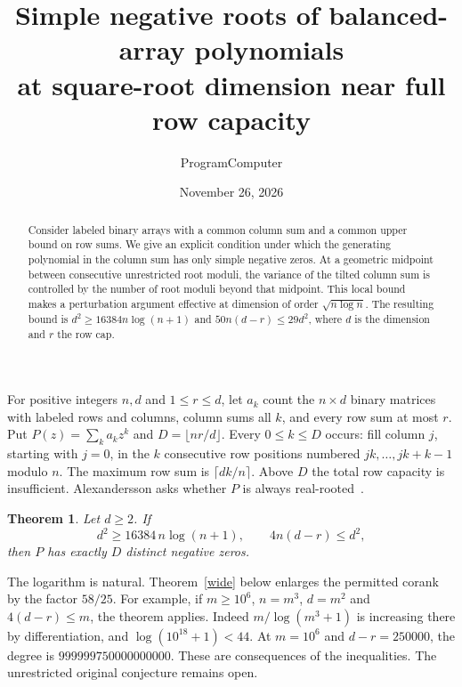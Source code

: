 \documentclass[11pt]{article}
\title{Simple negative roots of balanced-array polynomials\\at square-root dimension near full row capacity}
\author{ProgramComputer}
\date{November 26, 2026}
\newtheorem{theorem}{Theorem}
\begin{document}
\maketitle
\begin{abstract}
Consider labeled binary arrays with a common column sum and a common upper bound on row sums. We give an explicit condition under which the generating polynomial in the column sum has only simple negative zeros. At a geometric midpoint between consecutive unrestricted root moduli, the variance of the tilted column sum is controlled by the number of root moduli beyond that midpoint. This local bound makes a perturbation argument effective at dimension of order $\sqrt{n\log n}$. The resulting bound is $d^2\ge16384n\log(n+1)$ and $50n(d-r)\le29d^2$, where $d$ is the dimension and $r$ the row cap.
\end{abstract}

For positive integers $n,d$ and $1\le r\le d$, let $a_k$ count the $n\times d$ binary matrices with labeled rows and columns, column sums all $k$, and every row sum at most $r$. Put $P(z)=\sum_k a_k z^k$ and $D=\lfloor nr/d\rfloor$. Every $0\le k\le D$ occurs: fill column $j$, starting with $j=0$, in the $k$ consecutive row positions numbered $jk,\ldots,jk+k-1$ modulo $n$. The maximum row sum is $\lceil dk/n\rceil$. Above $D$ the total row capacity is insufficient. Alexandersson asks whether $P$ is always real-rooted~\cite{symcat}.

\begin{theorem}\label{thm}
Let $d\ge2$. If
\[
 d^2\ge 16384\,n\log(n+1),\qquad 4n(d-r)\le d^2,
\]
then $P$ has exactly $D$ distinct negative zeros.
\end{theorem}

The logarithm is natural. Theorem~\ref{wide} below enlarges the permitted corank by the factor $58/25$. For example, if $m\ge10^6$, $n=m^3$, $d=m^2$ and $4(d-r)\le m$, the theorem applies. Indeed $m/\log(m^3+1)$ is increasing there by differentiation, and $\log(10^{18}+1)<44$. At $m=10^6$ and $d-r=250000$, the degree is $999999750000000000$. These are consequences of the inequalities. The unrestricted original conjecture remains open.
\end{document}
